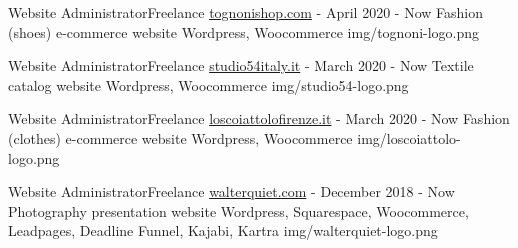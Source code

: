 
\begin{cventries}

  \logocventry
    {Website Administrator{\enskip\cdotp\enskip}Freelance}
    {\href{https://www.tognonishop.com}{tognonishop.com}}
    {-}
    {April 2020 - Now}
    {
      \cvexp
        {Fashion (shoes) e-commerce website}
        {}
        {Wordpress, Woocommerce}
    }
    {img/tognoni-logo.png}

  \logocventry
    {Website Administrator{\enskip\cdotp\enskip}Freelance}
    {\href{https://www.studio54italy.it}{studio54italy.it}}
    {-}
    {March 2020 - Now}
    {
      \cvexp
        {Textile catalog website}
        {}
        {Wordpress, Woocommerce}
    }
    {img/studio54-logo.png}

  \logocventry
    {Website Administrator{\enskip\cdotp\enskip}Freelance}
    {\href{https://www.loscoiattolofirenze.it}{loscoiattolofirenze.it}}
    {-}
    {March 2020 - Now}
    {
      \cvexp
        {Fashion (clothes) e-commerce website}
        {}
        {Wordpress, Woocommerce}
    }
    {img/loscoiattolo-logo.png}

  \logocventry
    {Website Administrator{\enskip\cdotp\enskip}Freelance}
    {\href{https://www.walterquiet.com}{walterquiet.com}}
    {-}
    {December 2018 - Now}
    {
      \cvexp
        {Photography presentation website}
        {}
        {Wordpress, Squarespace, Woocommerce, Leadpages, Deadline Funnel, Kajabi, Kartra}
    }
    {img/walterquiet-logo.png}

\end{cventries}
